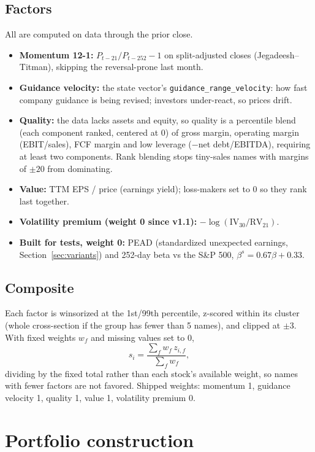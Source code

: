 \documentclass[11pt]{article}
\newcommand{\code}[1]{\texttt{#1}}
\begin{document}
\subsection{Factors}
All are computed on data through the prior close.
\begin{itemize}
\item \textbf{Momentum 12-1:} $P_{t-21}/P_{t-252}-1$ on split-adjusted closes (Jegadeesh--Titman), skipping the
reversal-prone last month.
\item \textbf{Guidance velocity:} the state vector's \code{guidance\_range\_velocity}: how fast company guidance is
being revised; investors under-react, so prices drift.
\item \textbf{Quality:} the data lacks assets and equity, so quality is a percentile blend (each component ranked,
centered at 0) of gross margin, operating margin (EBIT/sales), FCF margin and low leverage ($-$net debt/EBITDA),
requiring at least two components. Rank blending stops tiny-sales names with margins of $\pm20$ from dominating.
\item \textbf{Value:} TTM EPS / price (earnings yield); loss-makers set to 0 so they rank last together.
\item \textbf{Volatility premium (weight 0 since v1.1):} $-\log(\text{IV}_{30}/\text{RV}_{21})$.
\item \textbf{Built for tests, weight 0:} PEAD (standardized unexpected earnings, Section~\ref{sec:variants}) and
252-day beta vs the S\&P 500, $\beta^{s} = 0.67\beta + 0.33$.
\end{itemize}

\subsection{Composite}
Each factor is winsorized at the 1st/99th percentile, z-scored within its cluster (whole cross-section if the group has
fewer than 5 names), and clipped at $\pm3$. With fixed weights $w_f$ and missing values set to 0,
\[
s_i = \frac{\sum_f w_f\, z_{i,f}}{\sum_f w_f},
\]
dividing by the fixed total rather than each stock's available weight, so names with fewer factors are not favored.
Shipped weights: momentum 1, guidance velocity 1, quality 1, value 1, volatility premium 0.

\section{Portfolio construction}
\end{document}
